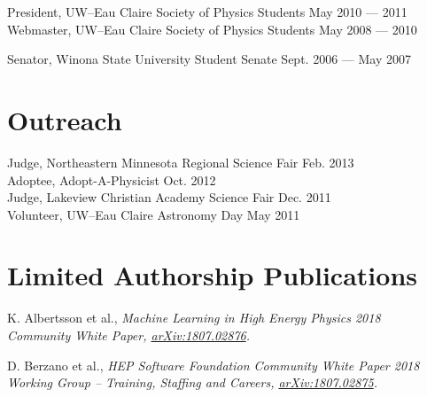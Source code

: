 \documentclass[11pt]{cv}
\begin{document}
\begin{cv}
President, UW--Eau Claire Society of Physics Students \hfill May 2010 --- 2011 \\
Webmaster, UW--Eau Claire Society of Physics Students \hfill May 2008 --- 2010

Senator, Winona State University Student Senate \hfill Sept. 2006 --- May 2007


\section{Outreach}
Judge, Northeastern Minnesota Regional Science Fair \hfill Feb. 2013 \\
Adoptee, Adopt-A-Physicist \hfill Oct. 2012 \\
Judge, Lakeview Christian Academy Science Fair \hfill Dec. 2011 \\
Volunteer, UW--Eau Claire Astronomy Day \hfill May 2011


\section{Limited Authorship Publications}
\begin{etaremune}
  \item K. Albertsson et al., \it Machine Learning in High Energy Physics \rm \hfill 2018 \\
  \it Community White Paper, \rm \href{https://arxiv.org/abs/1807.02876}{arXiv:1807.02876}.
  \item D. Berzano et al., \it HEP Software Foundation Community White Paper \rm \hfill 2018 \\
  \it Working Group -- Training, Staffing and Careers, \rm \href{https://arxiv.org/abs/1807.02875}{arXiv:1807.02875}.
\end{etaremune}

\newpage


\end{cv}
\end{document}
